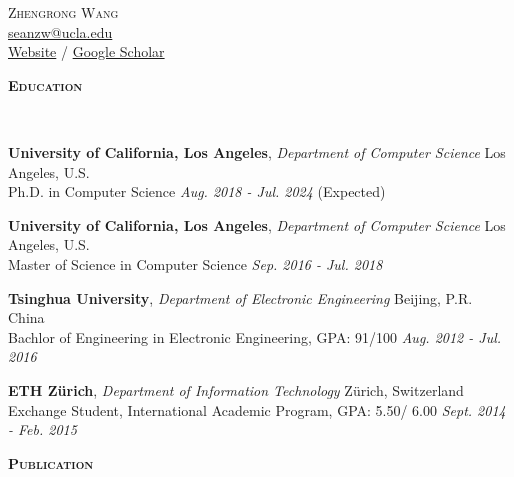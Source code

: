 \documentclass[a4paper]{article}
\newenvironment{changemargin}[2]{%
  \begin{list}{}{%
    \setlength{\topsep}{0pt}%
    \setlength{\leftmargin}{#1}%
    \setlength{\rightmargin}{#2}%
    \setlength{\listparindent}{\parindent}%
    \setlength{\itemindent}{\parindent}%
    \setlength{\parsep}{\parskip}%
  }%
  \item[]}{\end{list}
}
\newcommand{\lineover}{
	\begin{changemargin}{-0.05in}{-0.05in}
		\vspace*{-8pt}
		\hrulefill \\
		\vspace*{-2pt}
	\end{changemargin}
}
\newcommand{\header}[1]{
	\begin{changemargin}{-0.5in}{-0.5in}
		\scshape{\textbf{#1}}\\
  	\lineover
	\end{changemargin}
}
\newcommand{\contact}[4]{
	\begin{changemargin}{-0.5in}{-0.5in}
		\begin{center}
			{\Large \scshape {#1}}\\ \smallskip
			{\href{#2}{#2}} \\ \smallskip 
			{\href{#3}{Website}} /
			{\href{#4}{Google Scholar}}\smallskip
		\end{center}
	\end{changemargin}
}
\newenvironment{body} {
	\vspace*{-16pt}
	\begin{changemargin}{-0.25in}{-0.5in}
  }	
	{\end{changemargin}
}
\begin{document}
\contact{Zhengrong Wang}{seanzw@ucla.edu}{https://seanzw.github.io}{https://scholar.google.com/citations?user=h\_GwGfQAAAAJ\&hl=en}


\header{Education}

\begin{body}
	\vspace{14pt}

	\textbf{University of California, Los Angeles}, \emph{Department of Computer Science} \hfill Los Angeles, U.S. \\
Ph.D. in Computer Science \hfill \emph{Aug. 2018 - Jul. 2024} (Expected){} \\

\vspace{6pt}

	\textbf{University of California, Los Angeles}, \emph{Department of Computer Science} \hfill Los Angeles, U.S. \\
Master of Science in Computer Science \hfill \emph{Sep. 2016 - Jul. 2018}{} \\

\vspace{6pt}

	\textbf{Tsinghua University}, \emph{Department of Electronic Engineering} \hfill Beijing, P.R. China \\
Bachlor of Engineering in Electronic Engineering, GPA: 91/100 \hfill \emph{Aug. 2012 - Jul. 2016}{} \\
\vspace{6pt}

	\textbf{ETH Z\"urich}, \emph{Department of Information Technology} \hfill Z\"urich, Switzerland \\
	Exchange Student, International Academic Program, GPA: 5.50/ 6.00 \hfill \emph{Sept. 2014 - Feb. 2015}{} \\


\end{body}

\smallskip
\smallskip

\header{Publication}
\end{document}
